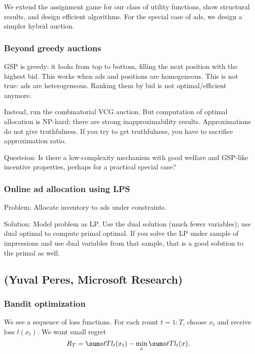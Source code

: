 We extend the assignment game for our class of utility functions, show structural results, and design efficient algorithms. For the special case of ads, we design a simpler hybrid auction.


\subsubsection{Beyond greedy auctions}

GSP is greedy: it looks from top to bottom, filling the next position with the highest bid. This works when ads and positions are homogeneous. This is not true: ads are heterogeneous. Ranking them by bid is not optimal/efficient anymore.

Instead, run the combinatorial VCG auction. But computation of optimal allocation is NP-hard; there are strong inapproximability results. Approximations do not give truthfulness. If you try to get truthfulness, you have to sacrifice approximation ratio. 

Questeion: Is there a low-complexity mechanism with good welfare and GSP-like incentive properties, perhaps for a practical special case?

\subsubsection{Online ad allocation using LPS}

Problem: Allocate inventory to ads under constraints.

Solution: Model problem as LP. Use the dual solution (much fewer variables); use dual optimal to compute primal optimal.  If you solve the LP under sample of impressions and use dual variables from that sample, that is a good solution to the primal as well.

\subsection{(Yuval Peres, Microsoft Research)}


\subsubsection{Bandit optimization}

We see a sequence of loss functions. For each rount $t=1:T$, choose $x_t$ and receive loss $l(x_t)$. We want small regret
$$
R_T=\sumo tT l_t(x_t)-\min_{x} \sumo tT l_t(x).
$$


